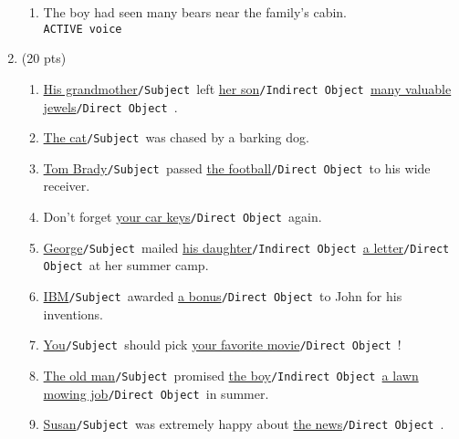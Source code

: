 \documentclass[11pt]{article}
\newcommand{\sub}{\texttt{/Subject }}
\newcommand{\dobj}{\texttt{/Direct Object }}
\newcommand{\iobj}{\texttt{/Indirect Object }}
\newcommand{\act}{\texttt{ACTIVE voice}}
\begin{document}
\begin{enumerate}
\begin{enumerate}
\item The boy had seen many bears near the family's cabin.\\
\act
\vspace*{.5in}

\end{enumerate}



\newpage

\item (20 pts) 

\begin{enumerate}

\item \underline{His grandmother}\sub left \underline{her son}\iobj \underline{many valuable jewels}\dobj.
\vspace*{.5in}

\item \underline{The cat}\sub was chased by a barking dog.
\vspace*{.5in}

\item \underline{Tom Brady}\sub passed \underline{the football}\dobj to his wide receiver.
\vspace*{.5in}

\item Don't forget \underline{your car keys}\dobj again.
\vspace*{.5in}

\item \underline{George}\sub mailed \underline{his daughter}\iobj \underline{a letter}\dobj at her summer camp. 
\vspace*{.5in}

\item \underline{IBM}\sub awarded \underline{a bonus}\dobj to John for his inventions.
\vspace*{.5in}

\item \underline{You}\sub should pick \underline{your favorite movie}\dobj!
\vspace*{.5in}

\item \underline{The old man}\sub promised \underline{the boy}\iobj \underline{a lawn mowing job}\dobj in summer.
\vspace*{.5in}

\item \underline{Susan}\sub was extremely happy about \underline{the news}\dobj.
\vspace*{.5in}


\end{enumerate}
\end{enumerate}
\end{document}
